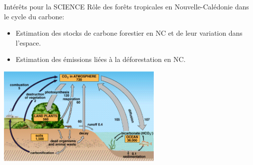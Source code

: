 \documentclass[10pt,table,dvipsnames,compress]{beamer}
\begin{document}
\begin{frame}[label={sec:org0900691}]{Intérêts pour la SCIENCE}
Rôle des forêts tropicales en Nouvelle-Calédonie dans le cycle du carbone:

\begin{itemize}
\item Estimation des stocks de carbone forestier en NC et de leur variation dans l'espace.
\item Estimation des émissions liées à la déforestation en NC.
\end{itemize}

\vspace{0.25cm}

\begin{center}
\includegraphics[width=0.6\textwidth]{figs/carbon_cycle.png}
\end{center}
\end{frame}
\end{document}
